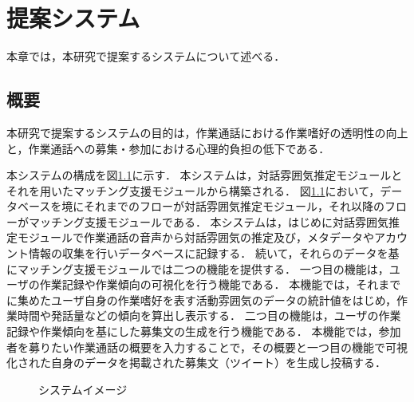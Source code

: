 \chapter{提案システム\label{sec:proposal_system}}
\thispagestyle{plain}

本章では，本研究で提案するシステムについて述べる．

\section{概要}

本研究で提案するシステムの目的は，作業通話における作業嗜好の透明性の向上と，作業通話への募集・参加における心理的負担の低下である．

本システムの構成を図\ref{fig:matching_system_big_arrow}に示す．
本システムは，対話雰囲気推定モジュールとそれを用いたマッチング支援モジュールから構築される．
図\ref{fig:matching_system_big_arrow}において，データベースを境にそれまでのフローが対話雰囲気推定モジュール，それ以降のフローがマッチング支援モジュールである．
本システムは，はじめに対話雰囲気推定モジュールで作業通話の音声から対話雰囲気の推定及び，メタデータやアカウント情報の収集を行いデータベースに記録する．
続いて，それらのデータを基にマッチング支援モジュールでは二つの機能を提供する．
一つ目の機能は，ユーザの作業記録や作業傾向の可視化を行う機能である．
本機能では，それまでに集めたユーザ自身の作業嗜好を表す活動雰囲気のデータの統計値をはじめ，作業時間や発話量などの傾向を算出し表示する．
二つ目の機能は，ユーザの作業記録や作業傾向を基にした募集文の生成を行う機能である．
本機能では，参加者を募りたい作業通話の概要を入力することで，その概要と一つ目の機能で可視化された自身のデータを掲載された募集文（ツイート）を生成し投稿する．

\begin{figure}
    \centering
    \caption{システムイメージ}
    \label{fig:matching_system_big_arrow}
\end{figure}

